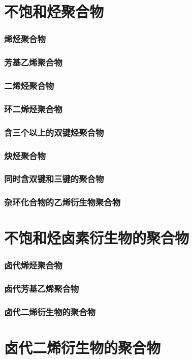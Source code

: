 \documentclass[UTF8]{../03-Chemistry}
\begin{document}
\section{不饱和烃聚合物}
    \subsubsection{烯烃聚合物}
    \subsubsection{芳基乙烯聚合物}
    \subsubsection{二烯烃聚合物}
    \subsubsection{环二烯烃聚合物}
    \subsubsection{含三个以上的双键烃聚合物}
    \subsubsection{炔烃聚合物}
    \subsubsection{同时含双键和三键的聚合物}
    \subsubsection{杂环化合物的乙烯衍生物聚合物}
\section{不饱和烃卤素衍生物的聚合物}
    \subsubsection{卤代烯烃聚合物}
    \subsubsection{卤代芳基乙烯聚合物}
    \subsubsection{卤代二烯衍生物的聚合物}
\section{卤代二烯衍生物的聚合物}
\end{document}
